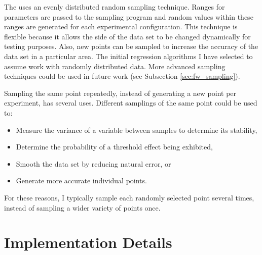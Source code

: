 The \fw uses an evenly distributed random sampling technique.
Ranges for parameters are passed to the sampling program and random values within these ranges are generated for each experimental configuration.
This technique is flexible because it allows the side of the data set to be changed dynamically for testing purposes.
Also, new points can be sampled to increase the accuracy of the data set in a particular area.
The initial regression algorithms I have selected to assume \fw  work with randomly distributed data.
More advanced sampling techniques could be used in future work (see Subsection \ref{sec:fw_sampling}).

Sampling the same point repeatedly, instead of generating a new point per experiment, has several uses.
Different samplings of the same point could be used to:
\begin{itemize}
   \item Measure the variance of a variable between samples to determine its stability,
   \item Determine the probability of a threshold effect being exhibited,
   \item Smooth the data set by reducing natural error, or
   \item Generate more accurate individual points.
\end{itemize}
For these reasons, I typically sample each randomly selected point several times, instead of sampling a wider variety of points once.

\section{Implementation Details}

